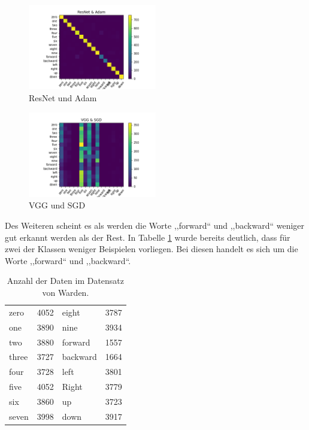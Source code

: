 \documentclass[sigconf]{acmart}
\begin{document}
\newpage

\begin{figure}[ht]
  \includegraphics[width=0.5\textwidth]{images/Confusion-Matrix_ResNet_Adam}
  \caption{ResNet und Adam}
  \Description{}
  \label{fig:Confusion-Matrix_ResNet_Adam}
\end{figure} 

\begin{figure}[ht]
  \includegraphics[width=0.5\textwidth]{images/Confusion-Matrix_VGG_SGD}
  \caption{VGG und SGD}
  \Description{}
  \label{fig:Confusion-Matrix_VGG_SGD}
\end{figure} 

Des Weiteren scheint es als werden die Worte ,,forward“ und ,,backward“ weniger gut erkannt werden als der Rest. In Tabelle \ref{table:data} wurde bereits deutlich, dass für zwei der Klassen weniger Beispielen vorliegen. Bei diesen handelt es sich um die Worte ,,forward“ und ,,backward“.
\newline
\newline

\begin{table}[ht]
\centering
\begin{tabular}{llll}
zero & 4052 & eight & 3787  \\
one & 3890 & nine & 3934  \\
two & 3880 & forward & 1557  \\
three &  3727 & backward & 1664 \\
four & 3728 & left & 3801 \\
five & 4052 & Right & 3779\\
six & 3860 & up & 3723\\
seven & 3998 & down & 3917 
\end{tabular}
\caption{Anzahl der Daten im Datensatz von Warden\cite{speechcommandsv2}.}
\label{table:data}
\end{table}
\end{document}
